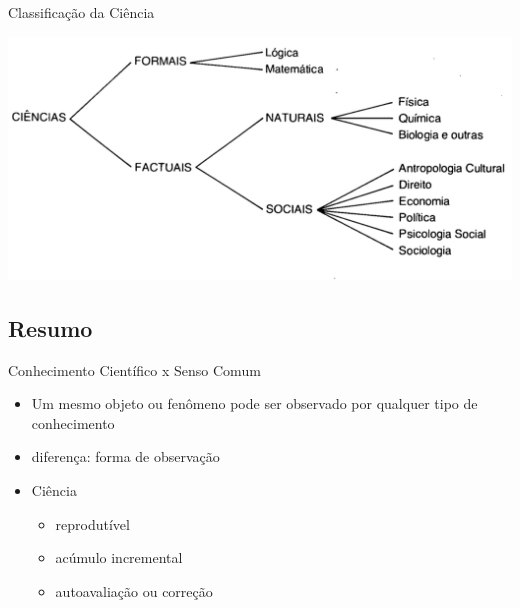 \documentclass{beamer}
\begin{document}
\begin{frame}{Classificação da Ciência}
  \begin{center}
    \includegraphics[width=\textwidth]{Intro/ciencias}
  \end{center}
\end{frame}


\subsection{Resumo}

\begin{frame}{Conhecimento Científico x Senso Comum}
  \begin{itemize}
  \item Um mesmo objeto ou fenômeno \alert{pode} ser observado por
    qualquer tipo de conhecimento
  \item diferença: forma de observação
  \item Ciência
    \begin{itemize}
    \item reprodutível
    \item acúmulo incremental
    \item autoavaliação ou correção
    \end{itemize}
  \end{itemize}
\end{frame}
\end{document}
